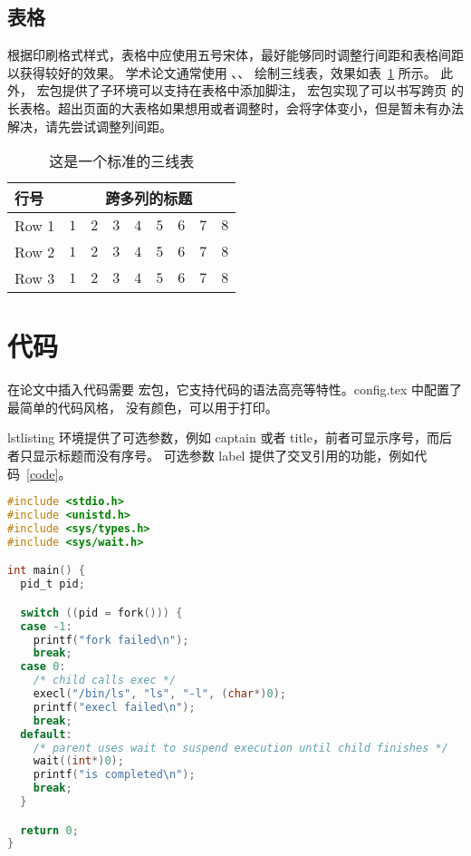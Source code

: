 \subsection{表格}

根据印刷格式样式，表格中应使用五号宋体，最好能够同时调整行间距和表格间距以获得较好的效果。
学术论文通常使用 、、 绘制三线表，效果如表~\ref{tab:sample} 所示。
此外， 宏包提供了子环境可以支持在表格中添加脚注， 宏包实现了可以书写跨页
的长表格。超出页面的大表格如果想用或者调整时，会将字体变小，但是暂未有办法解决，请先尝试调整列间距。

\begin{table}[!htbp]
  \caption{这是一个标准的三线表}\label{tab:sample}
  \centering
  \setlength{\tabcolsep}{4pt}%
  \renewcommand{\arraystretch}{1.2}%
  \begin{tabular}{lcccccccc}
      \toprule
      行号 & \multicolumn{8}{c}{跨多列的标题}\\
      \midrule
      Row 1 & $1$ & $2$ & $3$ & $4$ & $5$ & $6$ & $7$ & $8$\\
      Row 2 & $1$ & $2$ & $3$ & $4$ & $5$ & $6$ & $7$ & $8$\\
      Row 3 & $1$ & $2$ & $3$ & $4$ & $5$ & $6$ & $7$ & $8$\\
      \bottomrule
  \end{tabular}
\end{table}

\section{代码}

在论文中插入代码需要  宏包，它支持代码的语法高亮等特性。config.tex 中配置了最简单的代码风格，
没有颜色，可以用于打印。

lstlisting 环境提供了可选参数，例如 captain 或者 title，前者可显示序号，而后者只显示标题而没有序号。
可选参数 label 提供了交叉引用的功能，例如代码~\ref{code}。

\begin{lstlisting}[language=C,caption=代码样例,label=code]
#include <stdio.h>
#include <unistd.h>
#include <sys/types.h>
#include <sys/wait.h>

int main() {
  pid_t pid;

  switch ((pid = fork())) {
  case -1:
    printf("fork failed\n");
    break;
  case 0:
    /* child calls exec */
    execl("/bin/ls", "ls", "-l", (char*)0);
    printf("execl failed\n");
    break;
  default:
    /* parent uses wait to suspend execution until child finishes */
    wait((int*)0);
    printf("is completed\n");
    break;
  }

  return 0;
}\end{lstlisting}

